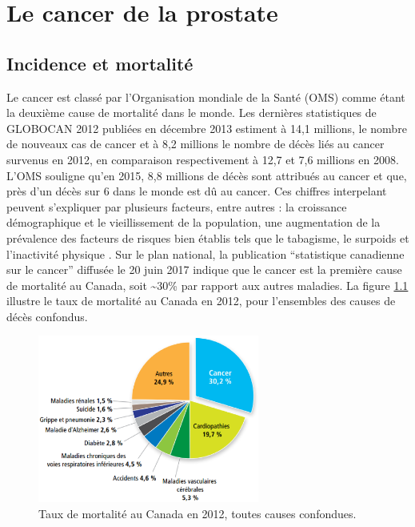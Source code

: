 \chapter{Le cancer de la prostate}     %
% 
% 
\section{Incidence et mortalité}
Le cancer est classé par l’Organisation mondiale de la Santé (OMS) \cite{OMS}  comme étant la deuxième cause de mortalité dans le monde. Les dernières statistiques de GLOBOCAN 2012 \cite{GLOBOCAN} publiées en décembre 2013 estiment à 14,1 millions, le nombre de nouveaux cas de cancer et à 8,2 millions le nombre de décès liés au cancer survenus en 2012, en comparaison respectivement à 12,7 et 7,6 millions en 2008. L’OMS souligne qu’en 2015, 8,8 millions de décès sont attribués au cancer et que, près d’un décès sur 6 dans le monde est dû au cancer. Ces chiffres interpelant peuvent s’expliquer par plusieurs facteurs, entre autres : la croissance démographique et le vieillissement de la population, une augmentation de la prévalence des facteurs de risques bien établis tels que le tabagisme, le surpoids et l'inactivité physique \cite{Torre}. Sur le plan national, la publication \enquote{statistique canadienne sur le cancer} diffusée le 20 juin 2017 \cite{StatCanada} indique que le cancer est la première cause de mortalité au Canada, soit \textasciitilde 30\% par rapport aux autres maladies. La figure \ref{FigureStatCancer1} \cite{StatCanada} illustre le taux de mortalité au Canada en 2012, pour l'ensembles des causes de décès confondus.
%
\begin{figure}%
\centering
\includegraphics[width=7.3cm,height=5.5cm]{FigureStatCancer1.eps}
\caption{\label{FigureStatCancer1} Taux de mortalité au Canada en 2012, toutes causes confondues.}
\end{figure}
